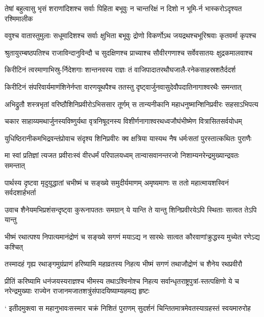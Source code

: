 \twolineshloka
{तेषां बहुत्वासु भृसं शराणांदिशश्च सर्वाः पिहिता बभूवुः}
{न चान्तरिक्षं न दिशो न भूमि-र्न भास्करोऽदृश्यत रश्मिमालीक}


\twolineshloka
{ववुश्च वातास्तुमुलाः सधूमादिशश्च सर्वाः क्षुभिता बभूवुः}
{द्रोणो विकर्णोऽथ जयद्रथश्चभूरिश्रवाः कृतवर्मा कृपश्च}


\twolineshloka
{श्रुतायुरम्बष्ठपतिश्च राजाविन्दानुविन्दौ च सुदक्षिणश्च}
{प्राच्याश्च सौवीरगणाश्च सर्वेवसातयः क्षुद्रकमालवाश्च}


\twolineshloka
{किरीटिनं त्वरमाणाभिस्रु-र्निदेशगाः शान्तनवस्य राज्ञः}
{तं वाजिपादातरथौघजालै-रनेकसाहस्रशतैर्ददर्श}


\twolineshloka
{किरीटिनं संपरिवार्यमाणंशिनेर्नप्ता वारणयूथपैश्च}
{ततस्तु दृष्ट्वार्जुनवासुदेवौपदातिनागाश्वरथैः समन्तात्}


\twolineshloka
{अभिद्रुतौ शस्त्रभृतां वरिष्ठौशिनिप्रवीरोऽभिससार तूर्णम्}
{स तान्यनीकानि महाधनुष्मान्शिनिप्रवीरः सहसाऽभिपत्य}


\twolineshloka
{चकार साहाय्यमथार्जुनस्यविष्णुर्यथा वृत्रनिषूदनस्य}
{विशीर्णनागाश्वरथध्वजौघंभीष्मेण वित्रासितसर्वयोधम्}


\twolineshloka
{युधिष्ठिरानीकमभिद्रवन्तंप्रोवाच संदृश्य शिनिप्रवीरः}
{क्व क्षत्रिया यास्यथ नैष धर्मःसतां पुरस्तात्कथितः पुराणैः}


\twolineshloka
{मा स्वां प्रतिज्ञां त्यजत प्रवीराःस्वं वीरधर्मं परिपालयध्वम्}
{तान्वासवानन्तरजो निशाम्यनरेन्द्रमुख्यान्द्रवतः समन्तात्}


\twolineshloka
{पार्थस्य दृष्टवा मृदुयुद्धातां चभीष्मं च सङ्ख्ये समुदीर्यमाणम्}
{अमृष्यमाणः स ततो महात्मायशस्विनं सर्वदशार्हभर्ता}


\twolineshloka
{उवाच शैनेयमभिप्रशंसन्दृष्ट्वा कुरूनापततः समग्रान्}
{ये यान्ति ते यान्तु शिनिप्रवीरयेऽपि स्थिताः सात्वत तेऽपि यान्तु}


\twolineshloka
{भीष्मं रथात्पश्य निपात्यमानंद्रोणं च सङ्ख्ये सगणं मयाऽद्य}
{न सारथेः सात्वत कौरवाणांक्रुद्धस्य मुच्येत रणेऽद्य कश्चित्}


\twolineshloka
{तस्मादहं गृह्य रथाङ्गमुग्रंप्राणं हरिष्यामि महाव्रतस्य}
{निहत्य भीष्मं सगणं तथाजौद्रोणं च शैनेय रथप्रवीरौ}


\threelineshloka
{प्रीतिं करिष्यामि धनंजयस्यराज्ञश्च भीमस्य तथाऽश्विनोश्च}
{निहत्य सर्वान्धृतराष्ट्रपुत्रां-स्तत्पक्षिणो ये च नरेन्द्रमुख्याः}
{राज्येन राजानमजातशत्रुंसंपादयिष्याम्यहमद्य हृष्टः}


\twolineshloka
{` इतीदमुक्त्वा स महानुभावःसस्मार चक्रं निशितं पुराणम्}
{सुदर्शनं चिन्तितमात्रमेवतस्याग्रहस्तं स्वयमारुरोह}


